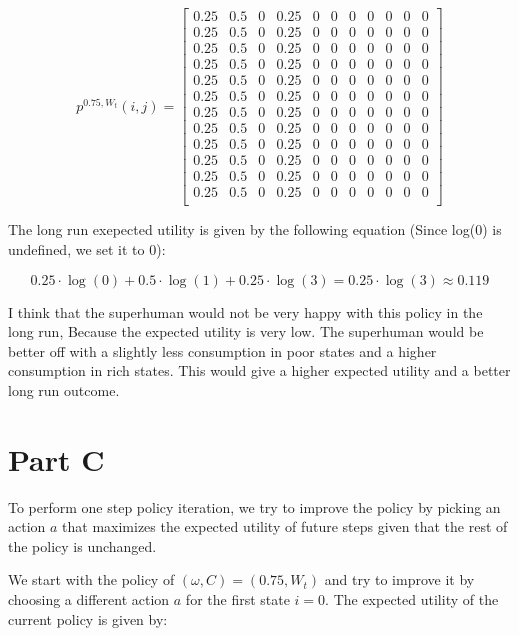 \documentclass[12pt]{article}
\begin{document}
$$
	p^{0.75,W_t}(i,j) =
	\begin{bmatrix}
		0.25 & 0.5 & 0 & 0.25 & 0 & 0 & 0 & 0 & 0 & 0 & 0 \\
		0.25 & 0.5 & 0 & 0.25 & 0 & 0 & 0 & 0 & 0 & 0 & 0 \\
		0.25 & 0.5 & 0 & 0.25 & 0 & 0 & 0 & 0 & 0 & 0 & 0 \\
		0.25 & 0.5 & 0 & 0.25 & 0 & 0 & 0 & 0 & 0 & 0 & 0 \\
		0.25 & 0.5 & 0 & 0.25 & 0 & 0 & 0 & 0 & 0 & 0 & 0 \\
		0.25 & 0.5 & 0 & 0.25 & 0 & 0 & 0 & 0 & 0 & 0 & 0 \\
		0.25 & 0.5 & 0 & 0.25 & 0 & 0 & 0 & 0 & 0 & 0 & 0 \\
		0.25 & 0.5 & 0 & 0.25 & 0 & 0 & 0 & 0 & 0 & 0 & 0 \\
		0.25 & 0.5 & 0 & 0.25 & 0 & 0 & 0 & 0 & 0 & 0 & 0 \\
		0.25 & 0.5 & 0 & 0.25 & 0 & 0 & 0 & 0 & 0 & 0 & 0 \\
		0.25 & 0.5 & 0 & 0.25 & 0 & 0 & 0 & 0 & 0 & 0 & 0 \\
		0.25 & 0.5 & 0 & 0.25 & 0 & 0 & 0 & 0 & 0 & 0 & 0 \\

	\end{bmatrix}
$$

The long run exepected utility is given by the following equation (Since log(0)
is undefined, we set it to 0):

$$ 0.25	\cdot \log(0) + 0.5 \cdot \log(1) + 0.25 \cdot \log(3) =0.25 \cdot \log(3) \approx 0.119 $$

I think that the superhuman would not be very happy with this policy in the
long run, Because the expected utility is very low. The superhuman would be
better off with a slightly less consumption in poor states and a higher
consumption in rich states. This would give a higher expected utility and a
better long run outcome.

\section{Part C}
To perform one step policy iteration, we try to improve the policy by picking
an action $a$ that maximizes the expected utility of future steps given that
the rest of the policy is unchanged.

We start with the policy of $(\omega,C) = (0.75,W_t)$ and try to improve it by
choosing a different action $a$ for the first state $i=0$. The expected utility
of the current policy is given by:
\end{document}
